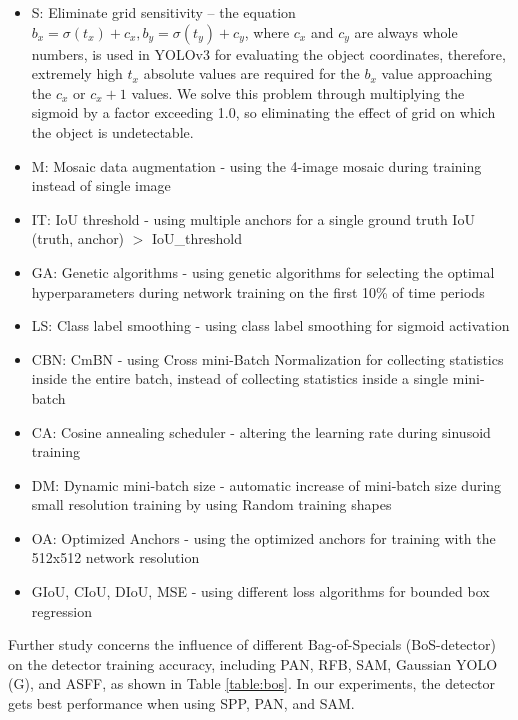 \documentclass[10pt,twocolumn,letterpaper]{article}
\begin{document}
\begin{itemize}
\item S: Eliminate grid sensitivity – the equation $b_x = \sigma(t_x) + c_x, b_y = \sigma(t_y) + c_y$, where $c_x$ and $c_y$ are always whole numbers, is used in YOLOv3 for evaluating the object coordinates, therefore, extremely high $t_x$ absolute values are required for the $b_x$ value approaching the $c_x$ or $c_x+1$ values.  We solve this problem through multiplying the sigmoid by a factor exceeding 1.0, so eliminating the effect of grid on which the object is undetectable.
\item M: Mosaic data augmentation - using the 4-image mosaic during training instead of single image
\item IT: IoU threshold - using multiple anchors for a single ground truth IoU (truth, anchor) $>$ IoU\_threshold
\item GA: Genetic algorithms - using genetic algorithms for selecting the optimal hyperparameters during network training on the first 10\% of time periods
\item LS: Class label smoothing - using class label smoothing for sigmoid activation
\item CBN: CmBN - using Cross mini-Batch Normalization for collecting statistics inside the entire batch, instead of collecting statistics inside a single mini-batch
\item CA: Cosine annealing scheduler - altering the learning rate during sinusoid training
\item DM: Dynamic mini-batch size - automatic increase of mini-batch size during small resolution training by using Random training shapes 
\item OA: Optimized Anchors - using the optimized anchors for training with the 512x512 network resolution
\item GIoU, CIoU, DIoU, MSE - using different loss algorithms for bounded box regression
\end{itemize}

Further study concerns the influence of different Bag-of-Specials (BoS-detector) on the detector training accuracy, including PAN, RFB, SAM, Gaussian YOLO (G), and ASFF, as shown in Table \ref{table:bos}. In our experiments, the detector gets best performance when using SPP, PAN, and SAM.
\end{document}

